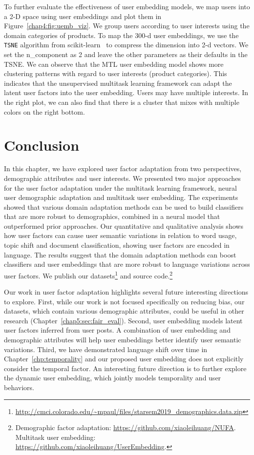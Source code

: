 To further evaluate the effectiveness of user embedding models, we map users into a 2-D space using user embeddings and plot them in Figure~\ref{chap4:fig:uemb_viz}.
We group users according to user interests using the domain categories of products.
To map the 300-d user embeddings, we use the \texttt{TSNE} algorithm from scikit-learn~\cite{pedregosa2011scikit} to compress the dimension into 2-d vectors. We set the n\_component as 2 and leave the other parameters as their defaults in the TSNE.
We can observe that the MTL user embedding model shows more clustering patterns with regard to user interests (product categories).
This indicates that the unsupervised multitask learning framework can adapt the latent user factors into the user embedding.
Users may have multiple interests. In the right plot, we can also find that there is a cluster that mixes with multiple colors on the right bottom.


\section{Conclusion}

In this chapter, we have explored user factor adaptation from two perspectives, demographic attributes and user interests.
We presented two major approaches for the user factor adaptation under the multitask learning framework, neural user demographic adaptation and multitask user embedding.
The experiments showed that various domain adaptation methods can be used to build classifiers that are more robust to demographics, combined in a neural model that outperformed prior approaches.
Our quantitative and qualitative analysis shows how user factors can cause user semantic variations in relation to word usage, topic shift and document classification, showing user factors are encoded in language.
The results suggest that the domain adaptation methods can boost classifiers and user embeddings that are more robust to language variations across user factors.
We publish our datasets\footnote{\url{http://cmci.colorado.edu/~mpaul/files/starsem2019_demographics.data.zip}} and source code.\footnote{Demographic factor adaptation: \url{https://github.com/xiaoleihuang/NUFA}. Multitask user embedding: \url{https://github.com/xiaoleihuang/UserEmbedding}.}

Our work in user factor adaptation highlights several future interesting directions to explore.
First, while our work is not focused specifically on reducing bias,
our datasets, which contain various demographic attributes, could be useful in other research (Chapter~\ref{chap5:sec:fair_eval}). 
Second, user embedding models latent user factors inferred from user posts. A combination of user embedding and demographic attributes will help user embeddings better identify user semantic variations. 
Third, we have demonstrated language shift over time in Chapter~\ref{chp:temporality} and our proposed user embedding does not explicitly consider the temporal factor. An interesting future direction is to further explore the dynamic user embedding, which jointly models temporality and user behaviors.
